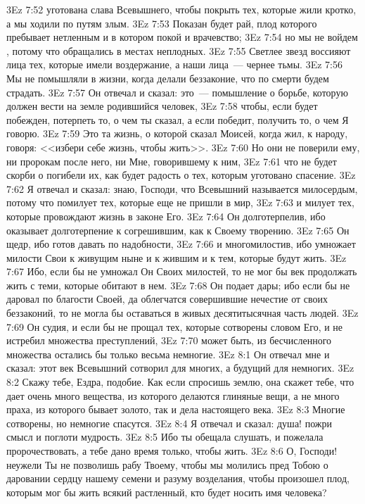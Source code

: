 \vs 3Ez 7:52 уготована слава Всевышнего, чтобы покрыть тех, которые жили кротко, а мы ходили по путям злым.
\vs 3Ez 7:53 Показан будет рай, плод которого пребывает нетленным и в котором покой и врачевство;
\vs 3Ez 7:54 но мы не войдем , потому что обращались в местах неплодных.
\vs 3Ez 7:55 Светлее звезд воссияют лица тех, которые имели воздержание, а наши лица~--- чернее тьмы.
\vs 3Ez 7:56 Мы не помышляли в жизни, когда делали беззаконие, что по смерти будем страдать.
\vs 3Ez 7:57 Он отвечал и сказал: это~--- помышление о борьбе, которую должен вести на земле родившийся человек,
\vs 3Ez 7:58 чтобы, если будет побежден, потерпеть то, о чем ты сказал, а если победит, получить то, о чем Я говорю.
\vs 3Ez 7:59 Это та жизнь, о которой сказал Моисей, когда жил, к народу, говоря: <<избери себе жизнь, чтобы жить>>.
\vs 3Ez 7:60 Но они не поверили ему, ни пророкам после него, ни Мне, говорившему к ним,
\vs 3Ez 7:61 что не будет скорби о погибели их, как будет радость о тех, которым уготовано спасение.
\vs 3Ez 7:62 Я отвечал и сказал: знаю, Господи, что Всевышний называется милосердым, потому что помилует тех, которые еще не пришли в мир,
\vs 3Ez 7:63 и милует тех, которые провождают жизнь в законе Его.
\vs 3Ez 7:64 Он долготерпелив, ибо оказывает долготерпение к согрешившим, как к Своему творению.
\vs 3Ez 7:65 Он щедр, ибо готов давать по надобности,
\vs 3Ez 7:66 и многомилостив, ибо умножает милости Свои к живущим ныне и к жившим и к тем, которые будут жить.
\vs 3Ez 7:67 Ибо, если бы не умножал Он Своих милостей, то не мог бы век продолжать жить с теми, которые обитают в нем.
\vs 3Ez 7:68 Он подает дары; ибо если бы не даровал по благости Своей, да облегчатся совершившие нечестие от своих беззаконий, то не могла бы оставаться в живых десятитысячная часть людей.
\vs 3Ez 7:69 Он судия, и если бы не прощал тех, которые сотворены словом Его, и не истребил множества преступлений,
\vs 3Ez 7:70 может быть, из бесчисленного множества остались бы только весьма немногие.
\vs 3Ez 8:1 Он отвечал мне и сказал: этот век Всевышний сотворил для многих, а будущий для немногих.
\vs 3Ez 8:2 Скажу тебе, Ездра, подобие. Как если спросишь землю, она скажет тебе, что дает очень много вещества, из которого делаются глиняные вещи, а не много праха, из которого бывает золото, так и дела настоящего века.
\vs 3Ez 8:3 Многие сотворены, но немногие спасутся.
\vs 3Ez 8:4 Я отвечал и сказал: душа! пожри смысл и поглоти мудрость.
\vs 3Ez 8:5 Ибо ты обещала слушать, и пожелала пророчествовать, а тебе дано время только, чтобы жить.
\vs 3Ez 8:6 О, Господи! неужели Ты не позволишь рабу Твоему, чтобы мы молились пред Тобою о даровании сердцу нашему семени и разуму возделания, чтобы произошел плод, которым мог бы жить всякий растленный, кто будет носить имя человека?
